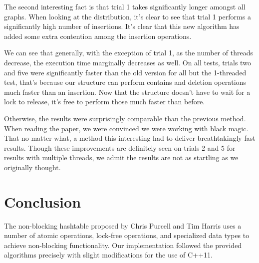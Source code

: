 \documentclass[journal]{IEEEtran}
\begin{document}
The second interesting fact is that trial 1 takes significantly longer amongst all graphs. When looking at the distribution, it's clear to see that trial 1 performs a significantly high number of insertions. It's clear that this new algorithm has added some extra contention among the insertion operations.

We can see that generally, with the exception of trial 1, as the number of threads decrease, the execution time marginally decreases as well. On all tests, trials two and five were significantly faster than the old version for all but the 1-threaded test, that's because our structure can perform contains and deletion operations much faster than an insertion. Now that the structure doesn't have to wait for a lock to release, it's free to perform those much faster than before.

Otherwise, the results were surprisingly comparable than the previous method. When reading the paper, we were convinced we were working with black magic. That no matter what, a method this interesting had to deliver breathtakingly fast results. Though these improvements are definitely seen on trials 2 and 5 for results with multiple threads, we admit the results are not as startling as we originally thought.


\section{Conclusion}

The non-blocking hashtable proposed by Chris Purcell and Tim Harris uses a number of atomic operations, lock-free operations, and specialized data types to achieve non-blocking functionality.  Our implementation followed the provided algorithms precisely with slight modifications for the use of C++11. 


\ifCLASSOPTIONcaptionsoff
  \newpage
\fi



\end{document}
